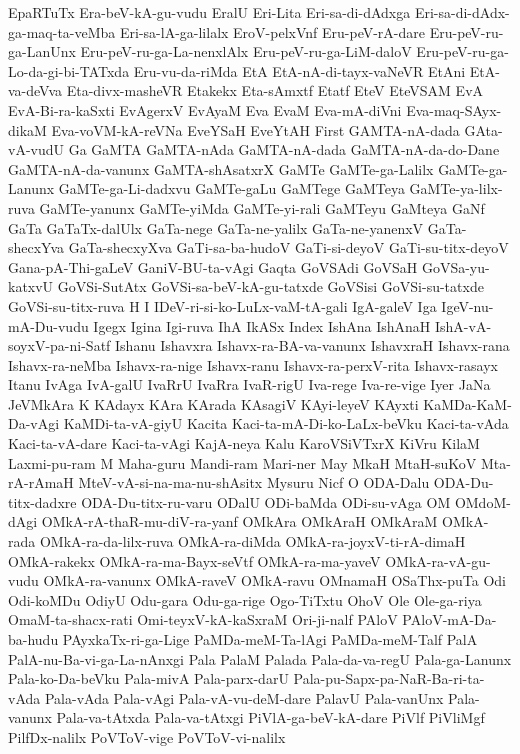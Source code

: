 {EpaRTuTx
Era-beV-kA-gu-vudu
EralU
Eri-Lita
Eri-sa-di-dAdxga
Eri-sa-di-dAdx-ga-maq-ta-veMba
Eri-sa-lA-ga-lilalx
EroV-pelxVnf
Eru-peV-rA-dare
Eru-peV-ru-ga-LanUnx
Eru-peV-ru-ga-La-nenxlAlx
Eru-peV-ru-ga-LiM-daloV
Eru-peV-ru-ga-Lo-da-gi-bi-TATxda
Eru-vu-da-riMda
EtA
EtA-nA-di-tayx-vaNeVR
EtAni
EtA-va-deVva
Eta-divx-masheVR
Etakekx
Eta-sAmxtf
Etatf
EteV
EteVSAM
EvA
EvA-Bi-ra-kaSxti
EvAgerxV
EvAyaM
Eva
EvaM
Eva-mA-diVni
Eva-maq-SAyx-dikaM
Eva-voVM-kA-reVNa
EveYSaH
EveYtAH
First
GAMTA-nA-dada
GAta-vA-vudU
Ga
GaMTA
GaMTA-nAda
GaMTA-nA-dada
GaMTA-nA-da-do-Dane
GaMTA-nA-da-vanunx
GaMTA-shAsatxrX
GaMTe
GaMTe-ga-Lalilx
GaMTe-ga-Lanunx
GaMTe-ga-Li-dadxvu
GaMTe-gaLu
GaMTege
GaMTeya
GaMTe-ya-lilx-ruva
GaMTe-yanunx
GaMTe-yiMda
GaMTe-yi-rali
GaMTeyu
GaMteya
GaNf
GaTa
GaTaTx-dalUlx
GaTa-nege
GaTa-ne-yalilx
GaTa-ne-yanenxV
GaTa-shecxYva
GaTa-shecxyXva
GaTi-sa-ba-hudoV
GaTi-si-deyoV
GaTi-su-titx-deyoV
Gana-pA-Thi-gaLeV
GaniV-BU-ta-vAgi
Gaqta
GoVSAdi
GoVSaH
GoVSa-yu-katxvU
GoVSi-SutAtx
GoVSi-sa-beV-kA-gu-tatxde
GoVSisi
GoVSi-su-tatxde
GoVSi-su-titx-ruva
H
I
IDeV-ri-si-ko-LuLx-vaM-tA-gali
IgA-galeV
Iga
IgeV-nu-mA-Du-vudu
Igegx
Igina
Igi-ruva
IhA
IkASx
Index
IshAna
IshAnaH
IshA-vA-soyxV-pa-ni-Satf
Ishanu
Ishavxra
Ishavx-ra-BA-va-vanunx
IshavxraH
Ishavx-rana
Ishavx-ra-neMba
Ishavx-ra-nige
Ishavx-ranu
Ishavx-ra-perxV-rita
Ishavx-rasayx
Itanu
IvAga
IvA-galU
IvaRrU
IvaRra
IvaR-rigU
Iva-rege
Iva-re-vige
Iyer
JaNa
JeVMkAra
K
KAdayx
KAra
KArada
KAsagiV
KAyi-leyeV
KAyxti
KaMDa-KaM-Da-vAgi
KaMDi-ta-vA-giyU
Kacita
Kaci-ta-mA-Di-ko-LaLx-beVku
Kaci-ta-vAda
Kaci-ta-vA-dare
Kaci-ta-vAgi
KajA-neya
Kalu
KaroVSiVTxrX
KiVru
KilaM
Laxmi-pu-ram
M
Maha-guru
Mandi-ram
Mari-ner
May
MkaH
MtaH-suKoV
Mta-rA-rAmaH
MteV-vA-si-na-ma-nu-shAsitx
Mysuru
Nicf
O
ODA-Dalu
ODA-Du-titx-dadxre
ODA-Du-titx-ru-varu
ODalU
ODi-baMda
ODi-su-vAga
OM
OMdoM-dAgi
OMkA-rA-thaR-mu-diV-ra-yanf
OMkAra
OMkAraH
OMkAraM
OMkA-rada
OMkA-ra-da-lilx-ruva
OMkA-ra-diMda
OMkA-ra-joyxV-ti-rA-dimaH
OMkA-rakekx
OMkA-ra-ma-Bayx-seVtf
OMkA-ra-ma-yaveV
OMkA-ra-vA-gu-vudu
OMkA-ra-vanunx
OMkA-raveV
OMkA-ravu
OMnamaH
OSaThx-puTa
Odi
Odi-koMDu
OdiyU
Odu-gara
Odu-ga-rige
Ogo-TiTxtu
OhoV
Ole
Ole-ga-riya
OmaM-ta-shacx-rati
Omi-teyxV-kA-kaSxraM
Ori-ji-nalf
PAloV
PAloV-mA-Da-ba-hudu
PAyxkaTx-ri-ga-Lige
PaMDa-meM-Ta-lAgi
PaMDa-meM-Talf
PalA
PalA-nu-Ba-vi-ga-La-nAnxgi
Pala
PalaM
Palada
Pala-da-va-regU
Pala-ga-Lanunx
Pala-ko-Da-beVku
Pala-mivA
Pala-parx-darU
Pala-pu-Sapx-pa-NaR-Ba-ri-ta-vAda
Pala-vAda
Pala-vAgi
Pala-vA-vu-deM-dare
PalavU
Pala-vanUnx
Pala-vanunx
Pala-va-tAtxda
Pala-va-tAtxgi
PiVlA-ga-beV-kA-dare
PiVlf
PiVliMgf
PilfDx-nalilx
PoVToV-vige
PoVToV-vi-nalilx
}
